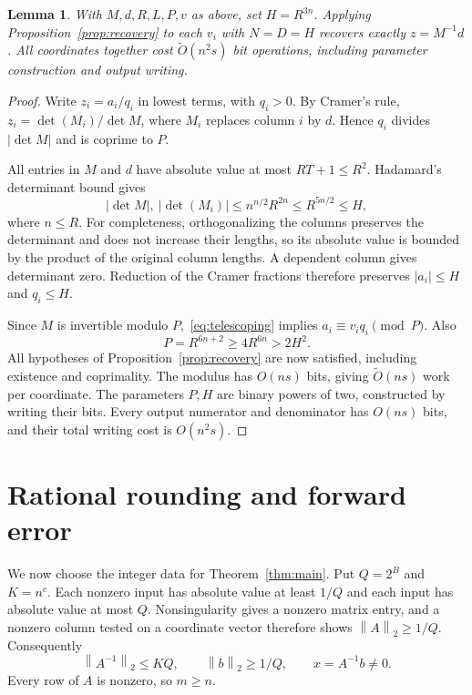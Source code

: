 \documentclass[11pt]{article}
\newtheorem{lemma}{Lemma}
\newcommand{\norm}[1]{\left\lVert#1\right\rVert}
\newcommand{\softO}{\widetilde O}
\begin{document}
\begin{lemma}\label{lem:height}
With $M,d,R,L,P,v$ as above, set $H=R^{3n}$. Applying
Proposition~\ref{prop:recovery} to each $v_i$ with $N=D=H$ recovers exactly
$z=M^{-1}d$. All coordinates together cost $\softO(n^2s)$ bit operations,
including parameter construction and output writing.
\end{lemma}
\begin{proof}
Write $z_i=a_i/q_i$ in lowest terms, with $q_i>0$. By Cramer's rule,
$z_i=\det(M_i)/\det M$, where $M_i$ replaces column $i$ by $d$. Hence
$q_i$ divides $|\det M|$ and is coprime to $P$.

All entries in $M$ and $d$ have absolute value at most $RT+1\leq R^2$.
Hadamard's determinant bound gives
\[
 |\det M|,\ |\det(M_i)|
 \leq n^{n/2}R^{2n}\leq R^{5n/2}\leq H,
\]
where $n\leq R$. For completeness, orthogonalizing the columns preserves
the determinant and does not increase their lengths, so its absolute value
is bounded by the product of the original column lengths. A dependent
column gives determinant zero. Reduction of the Cramer fractions therefore
preserves $|a_i|\leq H$ and $q_i\leq H$.

Since $M$ is invertible modulo $P$,~\eqref{eq:telescoping} implies
$a_i\equiv v_iq_i\pmod P$. Also
\[
 P=R^{6n+2}\geq4R^{6n}>2H^2.
\]
All hypotheses of Proposition~\ref{prop:recovery} are now satisfied,
including existence and coprimality. The modulus has $O(ns)$ bits, giving
$\softO(ns)$ work per coordinate. The parameters $P,H$ are binary powers
of two, constructed by writing their bits. Every output numerator and
denominator has $O(ns)$ bits, and their total writing cost is $O(n^2s)$.
\end{proof}

\section{Rational rounding and forward error}
We now choose the integer data for Theorem~\ref{thm:main}. Put
$Q=2^B$ and $K=n^c$. Each nonzero input has absolute value at least $1/Q$
and each input has absolute value at most $Q$. Nonsingularity gives a
nonzero matrix entry, and a nonzero column tested on a coordinate vector
therefore shows $\norm{A}_2\geq1/Q$. Consequently
\begin{equation}\label{eq:inputscale}
 \norm{A^{-1}}_2\leq KQ,\qquad
 \norm{b}_2\geq1/Q,
 \qquad x=A^{-1}b\ne0.
\end{equation}
Every row of $A$ is nonzero, so $m\geq n$.
\end{document}
